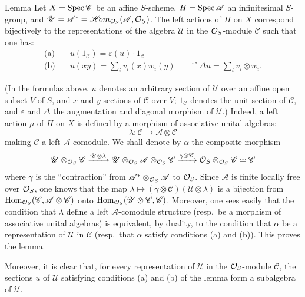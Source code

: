 \begin{enonce}{Lemma}{}
Let $X=\operatorname{Spec}\mathscr C$ be an affine $S$-scheme, $H=\operatorname{Spec}\mathscr A$ an infinitesimal $S$-group, and $\mathscr U=\mathscr A^*=\mathscr H\!om_{\mathcal{O}_S}(\mathscr A,\mathcal{O}_S)$. The left actions of $H$ on $X$ correspond bijectively to the representations of the algebra $\mathscr U$ in the $\mathcal{O}_S$-module $\mathscr C$ such that one has:
\begin{align*}
\text{(a)}\quad&u(1_{\mathscr C})=\varepsilon(u)\cdot1_{\mathscr C}\\
\text{(b)}\quad&u(xy)=\sum_i v_i(x)w_i(y)\qquad\text{if }\Delta u=\sum_i v_i\otimes w_i.
\end{align*}
\end{enonce}
(In the formulas above, $u$ denotes an arbitrary section of $\mathscr U$ over an affine open subset $V$ of $S$, and $x$ and $y$ sections of $\mathscr C$ over $V$; $1_{\mathscr C}$ denotes the unit section of $\mathscr C$, and $\varepsilon$ and $\Delta$ the augmentation and diagonal morphism of $\mathscr U$.) Indeed, a left action $\mu$ of $H$ on $X$ is defined by a morphism of associative unital algebras:
\[
\lambda:\mathscr C\longrightarrow\mathscr A\otimes\mathscr C
\]
making $\mathscr C$ a left $\mathscr A$-comodule. We shall denote by $\alpha$ the composite morphism
\[
\mathscr U\otimes_{\mathcal{O}_S}\mathscr C\xrightarrow{\mathscr U\otimes\lambda}\mathscr U\otimes_{\mathcal{O}_S}\mathscr A\otimes_{\mathcal{O}_S}\mathscr C\xrightarrow{\gamma\otimes\mathscr C}\mathcal{O}_S\otimes_{\mathcal{O}_S}\mathscr C\simeq\mathscr C
\]
where $\gamma$ is the ``contraction'' from $\mathscr A^*\otimes_{\mathcal{O}_S}\mathscr A$ to $\mathcal{O}_S$. Since $\mathscr A$ is finite locally free over $\mathcal{O}_S$, one knows that the map $\lambda\mapsto(\gamma\otimes\mathscr C)(\mathscr U\otimes\lambda)$ is a bijection from $\operatorname{Hom}_{\mathcal{O}_S}(\mathscr C,\mathscr A\otimes\mathscr C)$ onto $\operatorname{Hom}_{\mathcal{O}_S}(\mathscr U\otimes\mathscr C,\mathscr C)$. Moreover, one sees easily that the condition that $\lambda$ define a left $\mathscr A$-comodule structure (resp.\ be a morphism of associative unital algebras) is equivalent, by duality, to the condition that $\alpha$ be a representation of $\mathscr U$ in $\mathscr C$ (resp.\ that $\alpha$ satisfy conditions (a) and (b)). This proves the lemma.

Moreover, it is clear that, for every representation of $\mathscr U$ in the $\mathcal{O}_S$-module $\mathscr C$, the sections $u$ of $\mathscr U$ satisfying conditions (a) and (b) of the lemma form a subalgebra of $\mathscr U$.

